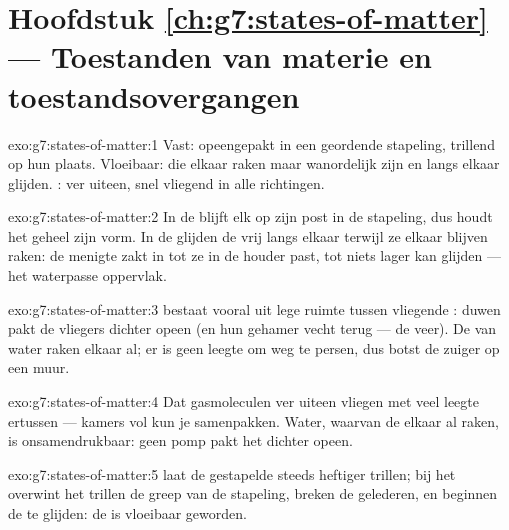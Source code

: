 \section*{Hoofdstuk \ref{ch:g7:states-of-matter} --- Toestanden van materie en toestandsovergangen}

\begin{solution}{exo:g7:states-of-matter:1}
Vast:  opeengepakt in een geordende stapeling, trillend
op hun plaats. Vloeibaar:  die elkaar raken maar
wanordelijk zijn en langs elkaar glijden. :  ver
uiteen, snel vliegend in alle richtingen.
\end{solution}

\begin{solution}{exo:g7:states-of-matter:2}
In de  blijft elk  op zijn post in de stapeling,
dus houdt het geheel zijn vorm. In de  glijden de
 vrij langs elkaar terwijl ze elkaar blijven raken: de
menigte zakt in tot ze in de houder past, tot niets lager kan glijden
--- het waterpasse oppervlak.
\end{solution}

\begin{solution}{exo:g7:states-of-matter:3}
 bestaat vooral uit lege ruimte tussen vliegende
: duwen pakt de vliegers dichter opeen (en hun gehamer vecht
terug --- de veer). De  van water raken elkaar al; er is geen
leegte om weg te persen, dus botst de zuiger op een muur.
\end{solution}

\begin{solution}{exo:g7:states-of-matter:4}
Dat gasmoleculen ver uiteen vliegen met veel leegte ertussen ---
kamers vol kun je samenpakken. Water, waarvan de  elkaar al
raken, is onsamendrukbaar: geen pomp pakt het dichter opeen.
\end{solution}

\begin{solution}{exo:g7:states-of-matter:5}
 laat de gestapelde  steeds heftiger trillen; bij het
 overwint het trillen de greep van de stapeling, breken de
gelederen, en beginnen de  te glijden: de  is
vloeibaar geworden.
\end{solution}

